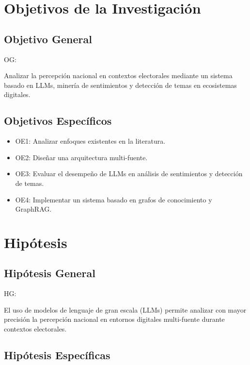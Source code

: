 \documentclass[listof=nochaptergap,12pt,times,authoryear]{report}
\begin{document}
\section{Objetivos de la Investigación}

\subsection{Objetivo General}
OG: \newcommand{\ObjetivoGeneral}{
Analizar la percepción nacional en contextos electorales mediante un sistema basado en LLMs, minería de sentimientos y detección de temas en ecosistemas digitales.
}
\ObjetivoGeneral
\subsection{Objetivos Específicos}

\newcommand{\Objone}{Analizar enfoques existentes en la literatura.}
\newcommand{\Objtwo}{Diseñar una arquitectura multi-fuente.}
\newcommand{\Objthree}{Evaluar el desempeño de LLMs en análisis de sentimientos y detección de temas.}
\newcommand{\Objfour}{Implementar un sistema basado en grafos de conocimiento y GraphRAG.}


\begin{itemize}
	\item OE1: {\Objone}
	\item OE2: {\Objtwo}
	\item OE3: {\Objthree}
	\item OE4: {\Objfour}
\end{itemize}

\section{Hipótesis}

\subsection{Hipótesis General}
HG: \newcommand{\HipotesisGeneral}{
El uso de modelos de lenguaje de gran escala (LLMs) permite analizar con mayor precisión la percepción nacional en entornos digitales multi-fuente durante contextos electorales.
}
\HipotesisGeneral
\subsection{Hipótesis Específicas}

\newcommand{\Hone}{La integración de múltiples fuentes de datos mejora la representatividad de la percepción pública.}
\newcommand{\Htwo}{Los modelos LLMs mejoran la precisión del análisis de sentimientos y detección de temas.}
\newcommand{\Hthree}{El uso de grafos de conocimiento permite modelar relaciones complejas entre actores y discursos.}
\newcommand{\Hfour}{El enfoque GraphRAG mejora la generación de insights en el análisis electoral.}
\end{document}
